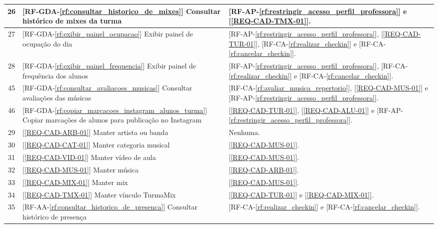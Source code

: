 \begin{longtable}{|c|p{6cm}|p{7cm}|}
    26 & [RF-GDA-\ref{rf:consultar_historico_de_mixes}] Consultar histórico de mixes da turma & [RF-AP-\ref{rf:restringir_acesso_perfil_professora}] e [\ref{REQ-CAD-TMX-01}]. \\ \hline
    27 & [RF-GDA-\ref{rf:exibir_painel_ocupacao}] Exibir painel de ocupação do dia & [RF-AP-\ref{rf:restringir_acesso_perfil_professora}], [\ref{REQ-CAD-TUR-01}], [RF-CA-\ref{rf:realizar_checkin}] e [RF-CA-\ref{rf:cancelar_checkin}]. \\ \hline
    28 & [RF-GDA-\ref{rf:exibir_painel_frequencia}] Exibir painel de frequência dos alunos & [RF-AP-\ref{rf:restringir_acesso_perfil_professora}], [RF-CA-\ref{rf:realizar_checkin}] e [RF-CA-\ref{rf:cancelar_checkin}]. \\ \hline
    45 & [RF-GDA-\ref{rf:consultar_avaliacoes_musicas}] Consultar avaliações das músicas & [RF-CA-\ref{rf:avaliar_musica_repertorio}], [\ref{REQ-CAD-MUS-01}] e [RF-AP-\ref{rf:restringir_acesso_perfil_professora}]. \\ \hline
    46 & [RF-GDA-\ref{rf:copiar_marcacoes_instagram_alunos_turma}] Copiar marcações de alunos para publicação no Instagram &  [\ref{REQ-CAD-TUR-01}], [\ref{REQ-CAD-ALU-01}] e [RF-AP-\ref{rf:restringir_acesso_perfil_professora}]. \\ \hline
    29 & [\ref{REQ-CAD-ARB-01}] Manter artista ou banda & Nenhuma. \\ \hline
    30 & [\ref{REQ-CAD-CAT-01}] Manter categoria musical & [\ref{REQ-CAD-MUS-01}]. \\ \hline
    31 & [\ref{REQ-CAD-VID-01}] Manter vídeo de aula & [\ref{REQ-CAD-MUS-01}]. \\ \hline
    32 & [\ref{REQ-CAD-MUS-01}] Manter música & [\ref{REQ-CAD-ARB-01}]. \\ \hline
    33 & [\ref{REQ-CAD-MIX-01}] Manter mix & [\ref{REQ-CAD-MUS-01}]. \\ \hline
    34 & [\ref{REQ-CAD-TMX-01}] Manter vínculo TurmaMix & [\ref{REQ-CAD-TUR-01}] e [\ref{REQ-CAD-MIX-01}]. \\ \hline
    35 & [RF-AA-\ref{rf:consultar_historico_de_presenca}] Consultar histórico de presença & [RF-CA-\ref{rf:realizar_checkin}] e [RF-CA-\ref{rf:cancelar_checkin}]. \\ \hline
\end{longtable}
\endgroup